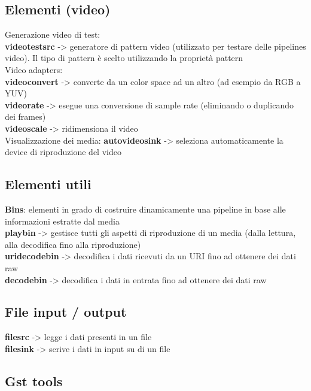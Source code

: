 \documentclass[8pt,a4paper]{article}
\begin{document}
\begin{multicols}{5}
    \subsection{Elementi (video)}
    Generazione video di test:\\
    \textbf{videotestsrc} -> generatore di pattern video (utilizzato per testare delle pipelines
    video). Il tipo di pattern è scelto utilizzando la proprietà pattern\\
    
    Video adapters:\\
    \textbf{videoconvert} -> converte da un color space ad un altro (ad esempio da RGB a YUV)\\
    \textbf{videorate} -> esegue una conversione di sample rate (eliminando o duplicando dei frames)\\
    \textbf{videoscale} -> ridimensiona il video\\

    Visualizzazione dei media:
    \textbf{autovideosink} -> seleziona automaticamente la device di riproduzione del video

    \subsection{Elementi utili}

    \textbf{Bins}: elementi in grado di costruire dinamicamente una pipeline in base alle informazioni estratte dal media\\
    
    \textbf{playbin} -> gestisce tutti gli aspetti di riproduzione di un media (dalla lettura, alla decodifica fino alla riproduzione)\\
    \textbf{uridecodebin} -> decodifica i dati ricevuti da un URI fino ad ottenere dei dati raw\\
    \textbf{decodebin} -> decodifica i dati in entrata fino ad ottenere dei dati raw
    
    \subsection{File input / output}
    
    \textbf{filesrc} -> legge i dati presenti in un file\\
    \textbf{filesink} -> scrive i dati in input su di un file\\

    \subsection{Gst tools} 


\end{multicols}
\end{document}
